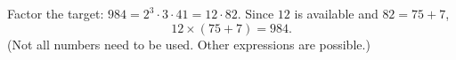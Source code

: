 Factor the target: $984=2^3\cdot3\cdot41=12\cdot82$. Since $12$ is available and $82=75+7$,
\[\boxed{12\times(75+7)=984}.\]
(Not all numbers need to be used. Other expressions are possible.)
